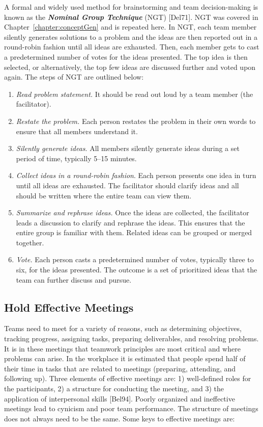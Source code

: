 A formal and widely used method for brainstorming and team
decision-making is known as the \emph{\textbf{Nominal Group Technique}}
(NGT) {[}Del71{]}. NGT was covered in Chapter~\ref{chapter:conceptGen} 
and is repeated here. In
NGT, each team member silently generates solutions to a problem and the
ideas are then reported out in a round-robin fashion until all ideas are
exhausted. Then, each member gets to cast a predetermined number of
votes for the ideas presented. The top idea is then selected, or
alternatively, the top few ideas are discussed further and voted upon
again. The steps of NGT are outlined below:

\begin{enumerate}
\def\labelenumi{\arabic{enumi}.}
\item
  \emph{Read problem statement.} It should be read out loud by a team
  member (the facilitator).
\item
  \emph{Restate the problem.} Each person restates the problem in their
  own words to ensure that all members understand it.
\item
  \emph{Silently generate ideas}. All members silently generate ideas
  during a set period of time, typically 5­--15 minutes.
\item
  \emph{Collect ideas in a round-robin fashion}. Each person presents
  one idea in turn until all ideas are exhausted. The facilitator should
  clarify ideas and all should be written where the entire team can view
  them.
\item
  \emph{Summarize and rephrase ideas.} Once the ideas are collected, the
  facilitator leads a discus­sion to clarify and rephrase the ideas. This
  ensures that the entire group is familiar with them. Related ideas can
  be grouped or merged together.
\item
  \emph{Vote.} Each person casts a predetermined number of votes,
  typically three to six, for the ideas presented. The outcome is a set
  of prioritized ideas that the team can further discuss and pursue.
\end{enumerate}

\subsection{Hold Effective Meetings}
\label{subsection:hold-effective-meetings}

Teams need to meet for a variety of reasons, such as determining
objectives, tracking progress, assigning tasks, preparing deliverables,
and resolving problems. It is in these meetings that teamwork principles
are most critical and where problems can arise. In the workplace it is
estimated that people spend half of their time in tasks that are related
to meetings (preparing, attending, and following up). Three elements of
effective meetings are: 1) well-defined roles for the participants, 2) a
structure for conducting the meeting, and 3) the application of
interpersonal skills {[}Bel94{]}. Poorly organized and ineffective
meetings lead to cynicism and poor team performance. The structure of
meetings does not always need to be the same. Some keys to effective
meetings are:

